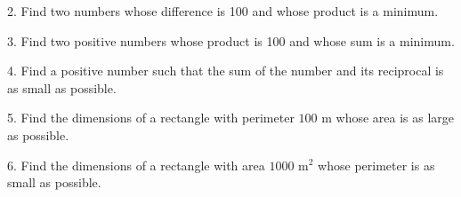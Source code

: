 \documentclass{sebase}
\begin{document}
\begin{multicols}{2}
\begin{ExerciseList}
\begin{ExerciseList}
%

%
\end{ExerciseList}

\item[\hfill 2.] Find two numbers whose difference is 100 and whose product
is a minimum.

%

\item[\hfill 3.] Find two positive numbers whose product is 100 and whose
sum is a minimum.

%

%

\item[\hfill 4.] Find a positive number such that the sum of the number and
its reciprocal is as small as possible.

%

\item[\hfill 5.] Find the dimensions of a rectangle with perimeter $100$ m
whose area is as large as possible.

%

%

\item[\hfill 6.] Find the dimensions of a rectangle with area $1000$ m$^{2}$
whose perimeter is as small as possible.


\end{ExerciseList}
\end{multicols}
\end{document}
